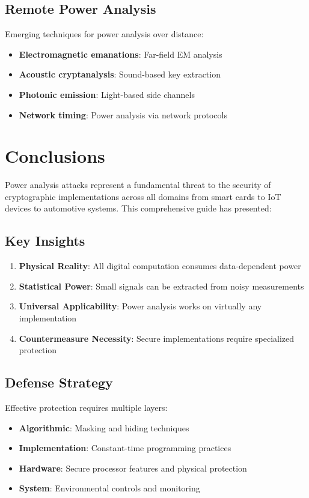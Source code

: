 \documentclass[11pt,a4paper]{article}
\theoremstyle{definition}
\begin{document}
\subsection{Remote Power Analysis}

Emerging techniques for power analysis over distance:
\begin{itemize}
    \item \textbf{Electromagnetic emanations}: Far-field EM analysis
    \item \textbf{Acoustic cryptanalysis}: Sound-based key extraction
    \item \textbf{Photonic emission}: Light-based side channels
    \item \textbf{Network timing}: Power analysis via network protocols
\end{itemize}

\section{Conclusions}

Power analysis attacks represent a fundamental threat to the security of cryptographic implementations across all domains from smart cards to IoT devices to automotive systems. This comprehensive guide has presented:

\subsection{Key Insights}

\begin{enumerate}
    \item \textbf{Physical Reality}: All digital computation consumes data-dependent power
    \item \textbf{Statistical Power}: Small signals can be extracted from noisy measurements
    \item \textbf{Universal Applicability}: Power analysis works on virtually any implementation
    \item \textbf{Countermeasure Necessity}: Secure implementations require specialized protection
\end{enumerate}

\subsection{Defense Strategy}

Effective protection requires multiple layers:
\begin{itemize}
    \item \textbf{Algorithmic}: Masking and hiding techniques
    \item \textbf{Implementation}: Constant-time programming practices
    \item \textbf{Hardware}: Secure processor features and physical protection  
    \item \textbf{System}: Environmental controls and monitoring
\end{itemize}
\end{document}
